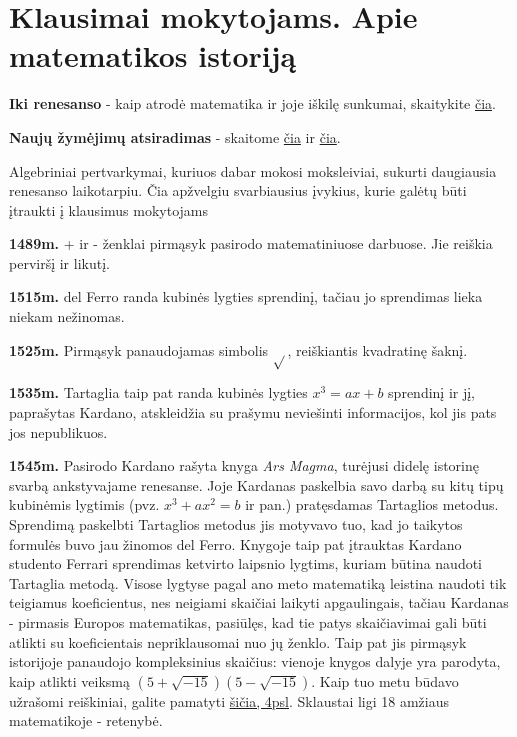 \documentclass{article}
\begin{document}
\tableofcontents{}
\section*{Klausimai mokytojams. Apie matematikos istoriją}

\textbf{Iki renesanso} - kaip atrodė matematika ir joje iškilę sunkumai, skaitykite \href{http://norvaisa.lt/matematika/mokykline-matematika/kodel-neigiamuju-skaiciu-sandauga-yra-teigiamas-skaicius/}{čia}. 

\textbf{Naujų žymėjimų atsiradimas} - skaitome \href{http://jeff560.tripod.com/operation.html}{čia} ir \href{https://www.math.ucdavis.edu/~anne/WQ2007/mat67-Common_Math_Symbols.pdf}{čia}.

Algebriniai pertvarkymai, kuriuos dabar mokosi moksleiviai, sukurti daugiausia renesanso laikotarpiu. Čia apžvelgiu svarbiausius įvykius, kurie galėtų būti įtraukti į klausimus mokytojams

\textbf{1489m.} + ir - ženklai pirmąsyk pasirodo matematiniuose darbuose. Jie reiškia perviršį ir likutį.

\textbf{1515m.} del Ferro randa kubinės lygties sprendinį, tačiau jo sprendimas lieka niekam nežinomas.

\textbf{1525m.} Pirmąsyk panaudojamas simbolis $\sqrt{}$, reiškiantis kvadratinę šaknį.

\textbf{1535m.} Tartaglia taip pat randa kubinės lygties $x^3=ax+b$ sprendinį ir jį, paprašytas Kardano, atskleidžia su prašymu neviešinti informacijos, kol jis pats jos nepublikuos.

\textbf{1545m.} Pasirodo Kardano rašyta knyga \textit{Ars Magma}, turėjusi didelę istorinę svarbą ankstyvajame renesanse. Joje Kardanas paskelbia savo darbą su kitų tipų kubinėmis lygtimis (pvz. $x^3+ax^2=b$ ir pan.) pratęsdamas Tartaglios metodus. Sprendimą paskelbti Tartaglios metodus jis motyvavo tuo, kad jo taikytos formulės buvo jau žinomos del Ferro. Knygoje taip pat įtrauktas Kardano studento Ferrari sprendimas ketvirto laipsnio lygtims, kuriam būtina naudoti Tartaglia metodą. Visose lygtyse pagal ano meto matematiką leistina naudoti tik teigiamus koeficientus, nes neigiami skaičiai laikyti apgaulingais, tačiau Kardanas - pirmasis Europos matematikas, pasiūlęs, kad tie patys skaičiavimai gali būti atlikti su koeficientais nepriklausomai nuo jų ženklo. Taip pat jis pirmąsyk istorijoje panaudojo kompleksinius skaičius: vienoje knygos dalyje yra parodyta, kaip atlikti veiksmą $(5+\sqrt{-15})(5-\sqrt{-15})$. Kaip tuo metu būdavo užrašomi reiškiniai, galite pamatyti \href{http://www.ms.uky.edu/~sohum/ma330/files/eqns_2.pdf}{šičia, 4psl}. Sklaustai ligi 18 amžiaus matematikoje - retenybė.
\end{document}
